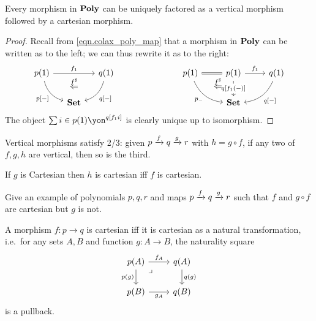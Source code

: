 \documentclass[Book-Poly]{subfiles}
\begin{document}
\begin{proposition}\label{prop.vert_cart_factorization}
Every morphism in $\mathbf{Poly}$ can be uniquely factored as a vertical morphism followed by a cartesian morphism.
\end{proposition}
\begin{proof}
Recall from \eqref{eqn.colax_poly_map} that a morphism in $\mathbf{Poly}$ can be written as to the left; we can thus rewrite it as to the right:
\[
\begin{tikzcd}[column sep=small]
	p(\1)\ar[dr, bend right, "{p[-]}"']\ar[rr, "f_1"]&~&
	q(\1)\ar[dl, bend left, "{q[-]}"]\\&
	\smset\ar[u, phantom, near end, "\overset{f^\sharp}{\Leftarrow}"]
\end{tikzcd}
\hspace{1in}
\begin{tikzcd}
	p(\1)\ar[dr, bend right, "p_-"']\ar[r, equal, ""' name=equal]&
	p(\1)\ar[d, "{q[f_1(-)]}" description]\ar[r, "f_1"]&
	q(\1)\ar[dl, bend left, "{q[-]}"]\\&
	|[alias=set]|\smset\ar[from=equal, to=set, pos=.3, phantom, "\overset{f^\sharp}{\Leftarrow}"]
\end{tikzcd}
\]
The object $\sum{i\in p(\1)}\yon^{q[f_1i]}$ is clearly unique up to isomorphism.
\end{proof}

\begin{proposition}
Vertical morphisms satisfy 2/3: given $p\xrightarrow{f}q\xrightarrow{g}r$ with $h=g\circ f$, if any two of $f,g,h$ are vertical, then so is the third.

If $g$ is Cartesian then $h$ is cartesian iff $f$ is cartesian.
\end{proposition}

\begin{exercise}
Give an example of polynomials $p,q,r$ and maps $p\xrightarrow{f}q\xrightarrow{g}r$ such that $f$ and $g\circ f$ are cartesian but $g$ is not.
\end{exercise}

\begin{proposition}\label{prop.cart_as_nt}
A morphism $f\colon p\to q$ is cartesian iff it is cartesian as a natural transformation, i.e.\ for any sets $A,B$ and function $g\colon A\to B$, the naturality square
\[
\begin{tikzcd}
	p(A)\ar[r, "f_A"]\ar[d, "p(g)"']&
	q(A)\ar[d, "q(g)"]\\
	p(B)\ar[r, "g_A"']&
	q(B)\ar[ul, phantom, very near end, "\lrcorner"]
\end{tikzcd}
\]
is a pullback.
\end{proposition}
\end{document}
